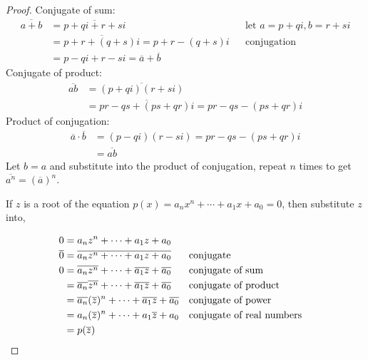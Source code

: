 \documentclass[b5paper]{article}
\begin{document}
\begin{Answer}[ref={ex:complex}]
{\begin{proof}
Conjugate of sum:
    \begin{align*}
    \overline{a + b} &= \overline{p + qi + r + si} && \text{let }a = p + qi, b = r + si \\
      &= \overline{p + r + (q + s)i} = p + r - (q + s)i &&\text{conjugation} \\
      &= p - qi + r - si = \overline{a} + \overline{b}
    \end{align*}
Conjugate of product:
    \begin{align*}
    \overline{ab} &= \overline{(p + qi)(r + si)} \\
      &= \overline{pr - qs + (ps + qr)i} = pr - qs - (ps + qr)i
    \end{align*}
Product of conjugation:
    \begin{align*}
    \overline{a} \cdot \overline{b} &= (p - qi)(r - si) = pr - qs - (ps + qr)i \\
      &= \overline{ab}
    \end{align*}
Let $b = a$ and substitute into the product of conjugation, repeat $n$ times to get $\overline{a^n} = (\overline{a})^n$.

If $z$ is a root of the equation $p(x) = a_nx^n + \dotsb + a_1 x + a_0 = 0$, then substitute $z$ into,

\begin{align*}
0 &= a_nz^n + \dotsb + a_1 z + a_0 \\
\overline{0}  &= \overline{a_nz^n + \dotsb + a_1 z + a_0} && \text{conjugate}\\
0 &= \overline{a_nz^n} + \dotsb + \overline{a_1 z} + \overline{a_0} && \text{conjugate of sum}\\
  &= \overline{a_n}\overline{z^n} + \dotsb + \overline{a_1}\overline{z} + \overline{a_0} && \text{conjugate of product}\\
  &= \overline{a_n}(\overline{z})^n + \dotsb + \overline{a_1}\overline{z} + \overline{a_0} && \text{conjugate of power}\\
  &= a_n(\overline{z})^n + \dotsb + a_1\overline{z} + a_0 && \text{conjugate of real numbers} \\
  &= p(\overline{z}) && \qedhere
\end{align*}
\end{proof}
}

\end{Answer}
\end{document}
